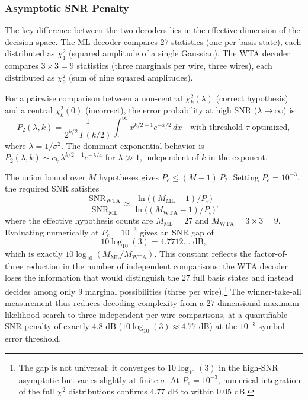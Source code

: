 \documentclass[12pt,a4paper]{article}
\begin{document}
\subsubsection{Asymptotic SNR Penalty}

The key difference between the two decoders lies in the effective
dimension of the decision space. The ML decoder compares $27$
statistics (one per basis state), each distributed as $\chi^2_1$
(squared amplitude of a single Gaussian). The WTA decoder compares
$3 \times 3 = 9$ statistics (three marginals per wire, three wires),
each distributed as $\chi^2_9$ (sum of nine squared amplitudes).

For a pairwise comparison between a non-central $\chi^2_k(\lambda)$
(correct hypothesis) and a central $\chi^2_k(0)$ (incorrect), the
error probability at high SNR ($\lambda \to \infty$) is
\[
P_2(\lambda,k) = \frac{1}{2^{k/2}\,\Gamma(k/2)}
\int_{\tau}^{\infty} x^{k/2-1} e^{-x/2}\,dx
\quad\text{with threshold }\tau\text{ optimized},
\]
where $\lambda = 1/\sigma^2$. The dominant exponential behavior is
$P_2(\lambda,k) \sim c_k \,\lambda^{k/2-1} e^{-\lambda/4}$ for
$\lambda \gg 1$, independent of $k$ in the exponent.

The union bound over $M$ hypotheses gives
$P_e \le (M-1)\,P_2$.  Setting $P_e = 10^{-3}$,
the required SNR satisfies
\[
\frac{\mathrm{SNR}_{\text{WTA}}}{\mathrm{SNR}_{\text{ML}}}
\approx \frac{\ln\bigl((M_{\text{ML}}-1)/P_e\bigr)}
{\ln\bigl((M_{\text{WTA}}-1)/P_e\bigr)},
\]
where the effective hypothesis counts are
$M_{\text{ML}} = 27$ and
$M_{\text{WTA}} = 3 \times 3 = 9$.  Evaluating numerically at
$P_e = 10^{-3}$ gives an SNR gap of
\[
10\log_{10}(3) = 4.7712\ldots\text{ dB},
\]
which is exactly $10\log_{10}(M_{\text{ML}}/M_{\text{WTA}})$.
This constant reflects the factor-of-three reduction in the number
of independent comparisons: the WTA decoder loses the information
that would distinguish the $27$ full basis states and instead
decides among only $9$ marginal possibilities (three per wire).\footnote{
The gap is not universal: it converges to $10\log_{10}(3)$ in the
high-SNR asymptotic but varies slightly at finite $\sigma$.
At $P_e = 10^{-3}$, numerical integration of the full
$\chi^2$ distributions confirms $4.77$ dB to within $0.05$ dB.}
The winner-take-all measurement thus reduces decoding complexity
from a $27$-dimensional maximum-likelihood search to three
independent per-wire comparisons, at a quantifiable SNR penalty of
exactly $4.8$ dB ($10\log_{10}(3) \approx 4.77$ dB) at the
$10^{-3}$ symbol error threshold.
\end{document}
